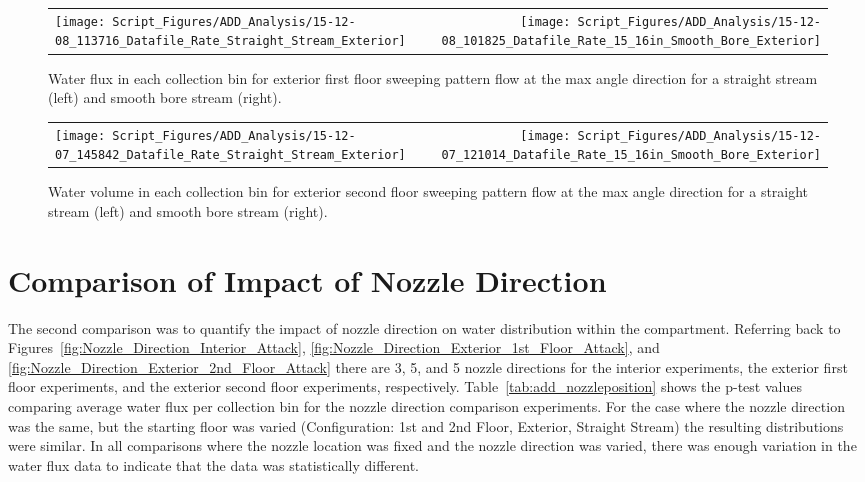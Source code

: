 \documentclass[12pt,oneside]{book}
\begin{document}
\begin{figure}[ht]
\begin{tabular*}{\textwidth}{lr}
\texttt{[image: Script\_Figures/ADD\_Analysis/15-12-08\_113716\_Datafile\_Rate\_Straight\_Stream\_Exterior]} &
\texttt{[image: Script\_Figures/ADD\_Analysis/15-12-08\_101825\_Datafile\_Rate\_15\_16in\_Smooth\_Bore\_Exterior]}
\end{tabular*}
\caption[Water Flux for Varying Exterior First Floor Sweeping Pattern Hose Stream Types]{Water flux in each collection bin for exterior first floor sweeping pattern flow at the max angle direction for a straight stream (left) and smooth bore stream (right).}
\label{fig:Exterior_FirstFloor_O_Varying_Nozzle}
\end{figure}

\begin{figure}[ht]
\begin{tabular*}{\textwidth}{lr}
\texttt{[image: Script\_Figures/ADD\_Analysis/15-12-07\_145842\_Datafile\_Rate\_Straight\_Stream\_Exterior]} &
\texttt{[image: Script\_Figures/ADD\_Analysis/15-12-07\_121014\_Datafile\_Rate\_15\_16in\_Smooth\_Bore\_Exterior]}
\end{tabular*}
\caption[Water Flux for Varying Exterior Second Floor Sweeping Pattern Hose Stream Types]{Water volume in each collection bin for exterior second floor sweeping pattern flow at the max angle direction for a straight stream (left) and smooth bore stream (right).}
\label{fig:Exterior_SecondFloor_O_Varying_Nozzle}
\end{figure}


\section{Comparison of Impact of Nozzle Direction}
\label{sec:direction}

The second comparison was to quantify the impact of nozzle direction on water distribution within the compartment. Referring back to Figures~\ref{fig:Nozzle_Direction_Interior_Attack}, \ref{fig:Nozzle_Direction_Exterior_1st_Floor_Attack}, and \ref{fig:Nozzle_Direction_Exterior_2nd_Floor_Attack} there are 3, 5, and 5 nozzle directions for the interior experiments, the exterior first floor experiments, and the exterior second floor experiments, respectively. Table~\ref{tab:add_nozzleposition} shows the p-test values comparing average water flux per collection bin  for the nozzle direction comparison experiments. For the case where the nozzle direction was the same, but the starting floor was varied (Configuration: 1st and 2nd Floor, Exterior, Straight Stream) the resulting distributions were similar. In all comparisons where the nozzle location was fixed and the nozzle direction was varied, there was enough variation in the water flux data to indicate that the data was statistically different. 
\end{document}
